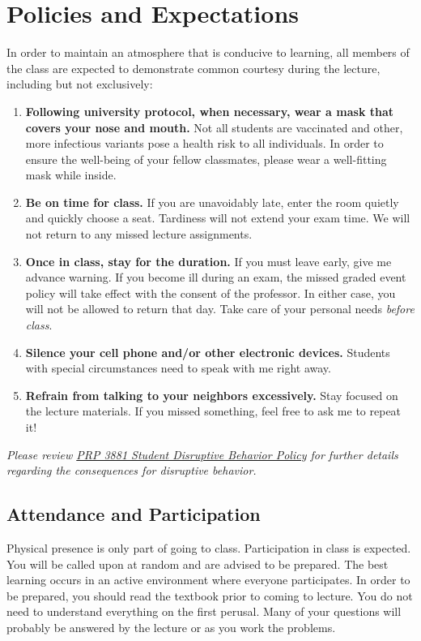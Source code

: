 \documentclass[11pt,letterpaper]{article}
\begin{document}
\section{Policies and Expectations}
In order to maintain an atmosphere that is conducive to learning, all members
of the class are expected to demonstrate common courtesy during the lecture,
including but not exclusively:
\begin{enumerate}
	\item \textbf{Following university protocol, when necessary, wear a mask
		that covers your nose and mouth.} Not all students are
		vaccinated and other, more infectious variants pose a health
		risk to all individuals. In order to ensure the well-being of
		your fellow classmates, please wear a well-fitting mask while
		inside.
	\item \textbf{Be on time for class.} If you are unavoidably late, enter
		the room quietly and quickly choose a seat.  Tardiness will not
		extend your exam time. We will not return to any missed lecture
		assignments.
	\item \textbf{Once in class, stay for the duration.} If you must leave
		early, give me advance warning. If you become ill during an
		exam, the missed graded event policy will take effect with the
		consent of the professor. In either case, you will not be
		allowed to return that day. Take care of your personal needs
		\emph{before class}.
	\item \textbf{Silence your cell phone and/or other electronic devices.}
		Students with special circumstances need to speak with me right
		away.
	\item \textbf{Refrain from talking to your neighbors excessively.} Stay
		focused on the lecture materials. If you missed something, feel
		free to ask me to repeat it!
\end{enumerate}
\emph{Please review
\href{https://www.bloomu.edu/prp-3881-student-disruptive-behavior-policy}{PRP 3881 Student
Disruptive Behavior Policy} for further details regarding the consequences for
disruptive behavior.}

\subsection{Attendance and Participation}
Physical presence is only part of going to class. Participation in class is
expected. You will be called upon at random and are advised to be prepared.
The best learning occurs in an active environment where everyone participates.
In order to be prepared, you should read the textbook prior to coming to
lecture.  You do not need to understand everything on the first perusal. Many
of your questions will probably be answered by the lecture or as you work the
problems.
\end{document}
